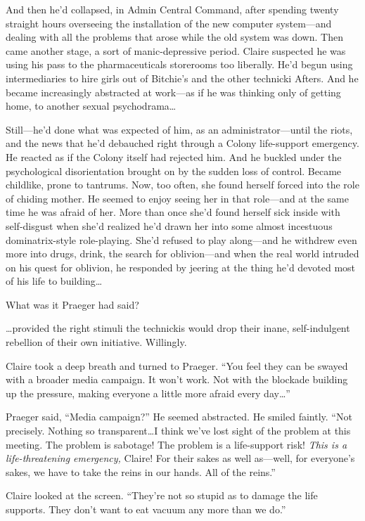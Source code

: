 And then he'd collapsed, in Admin Central Command, after spending twenty straight hours overseeing the installation of the new computer system---and dealing with all the problems that arose while the old system was down. Then came another stage, a sort of manic-depressive period. Claire suspected he was using his pass to the pharmaceuticals storerooms too liberally. He'd begun using intermediaries to hire girls out of Bitchie's and the other technicki Afters. And he became increasingly abstracted at work---as if he was thinking only of getting home, to another sexual psychodrama\ldots

Still---he'd done what was expected of him, as an administrator---until the riots, and the news that he'd debauched right through a Colony life-support emergency. He reacted as if the Colony itself had rejected him. And he buckled under the psychological disorientation brought on by the sudden loss of control. Became childlike, prone to tantrums. Now, too often, she found herself forced into the role of chiding mother. He seemed to enjoy seeing her in that role---and at the same time he was afraid of her. More than once she'd found herself sick inside with self-disgust when she'd realized he'd drawn her into some almost incestuous dominatrix-style role-playing. She'd refused to play along---and he withdrew even more into drugs, drink, the search for oblivion---and when the real world intruded on his quest for oblivion, he responded by jeering at the thing he'd devoted most of his life to building\ldots

What was it Praeger had said?

\ldots provided the right stimuli the technickis would drop their inane, self-indulgent rebellion of their own initiative. Willingly.

Claire took a deep breath and turned to Praeger. ``You feel they can be swayed with a broader media campaign. It won't work. Not with the blockade building up the pressure, making everyone a little more afraid every day\ldots ''

Praeger said, ``Media campaign?'' He seemed abstracted. He smiled faintly. ``Not precisely. Nothing so transparent\ldots I think we've lost sight of the problem at this meeting. The problem is sabotage! The problem is a life-support risk! \textit{This is a life-threatening emergency,} Claire! For their sakes as well as---well, for everyone's sakes, we have to take the reins in our hands. All of the reins.''

Claire looked at the screen. ``They're not so stupid as to damage the life supports. They don't want to eat vacuum any more than we do.''

